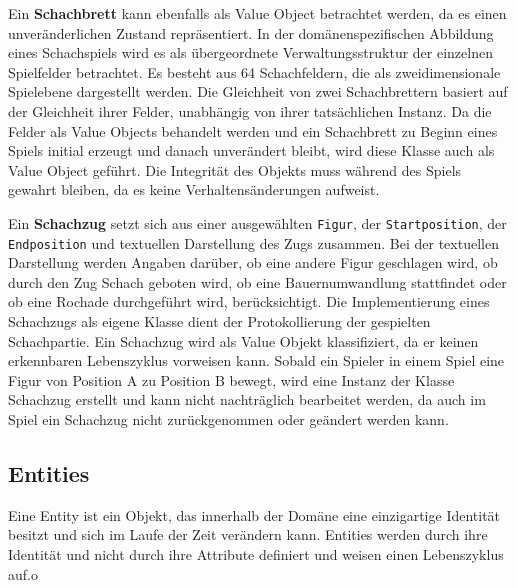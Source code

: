 Ein \textbf{Schachbrett} kann ebenfalls als Value Object betrachtet werden, da es einen unveränderlichen Zustand repräsentiert. 
In der domänenspezifischen Abbildung eines Schachspiels wird es als übergeordnete Verwaltungsstruktur der einzelnen Spielfelder betrachtet. 
Es besteht aus 64 Schachfeldern, die als zweidimensionale Spielebene dargestellt werden.
Die Gleichheit von zwei Schachbrettern basiert auf der Gleichheit ihrer Felder, unabhängig von ihrer tatsächlichen Instanz. 
Da die Felder als Value Objects behandelt werden und ein Schachbrett zu Beginn eines Spiels initial erzeugt und danach unverändert bleibt, wird diese Klasse auch als Value Object geführt. 
Die Integrität des Objekts muss während des Spiels gewahrt bleiben, da es keine Verhaltensänderungen aufweist. 

Ein \textbf{Schachzug} setzt sich aus einer ausgewählten \texttt{Figur}, der \texttt{Startposition}, der \texttt{Endposition} und textuellen Darstellung des Zugs zusammen.
Bei der textuellen Darstellung werden Angaben darüber, ob eine andere Figur geschlagen wird, ob durch den Zug Schach geboten wird, ob eine Bauernumwandlung stattfindet oder ob eine Rochade durchgeführt wird, berücksichtigt. 
Die Implementierung eines Schachzugs als eigene Klasse dient der Protokollierung der gespielten Schachpartie. 
Ein Schachzug wird als Value Objekt klassifiziert, da er keinen erkennbaren Lebenszyklus vorweisen kann. 
Sobald ein Spieler in einem Spiel eine Figur von Position A zu Position B bewegt, wird eine Instanz der Klasse Schachzug erstellt und kann nicht nachträglich bearbeitet werden, da auch im Spiel ein Schachzug nicht zurückgenommen oder geändert werden kann. 

\subsection*{Entities}

Eine Entity ist ein Objekt, das innerhalb der Domäne eine einzigartige Identität besitzt und sich im Laufe der Zeit verändern kann. 
Entities werden durch ihre Identität und nicht durch ihre Attribute definiert und weisen einen Lebenszyklus auf.o


